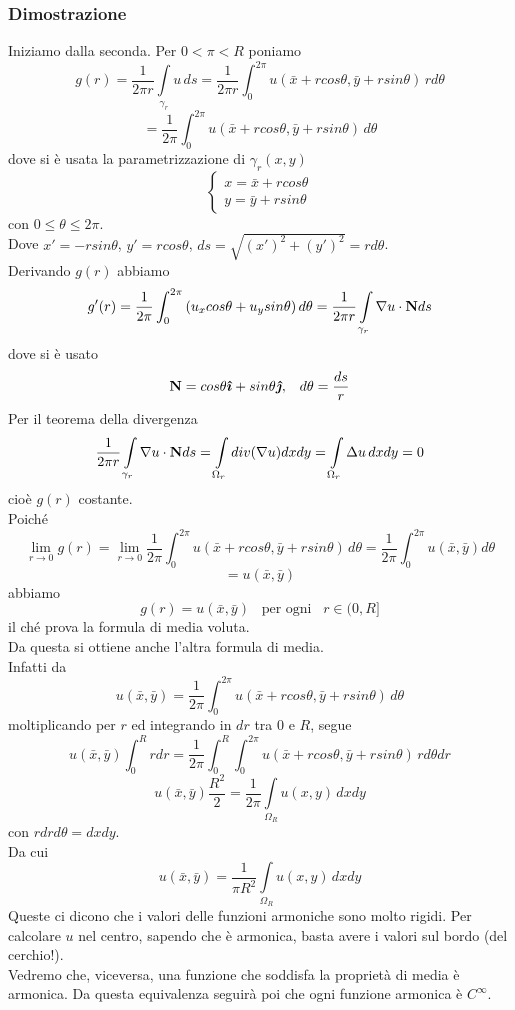 \subsubsection{Dimostrazione}
Iniziamo dalla seconda. Per $0<\pi<R$ poniamo
\[
	g(r)= \frac{1}{2\pi r}
	\int \limits_{\gamma_r}
	u \, ds=
	\frac{1}{2\pi r}
	\int_0^{2\pi}
	u(\bar{x}+rcos \theta, \bar{y} + rsin \theta) \, r d\theta
\]
\[
	= \frac{1}{2\pi}
	\int_0^{2\pi}
	u(\bar{x}+rcos \theta, \bar{y} + rsin \theta) \, d\theta
\]
dove si \`e usata la parametrizzazione di $\gamma_r(x,y)$
\[
	\left\{
		\begin{array}{l}
			x= \bar{x} + rcos\theta \\
			y= \bar{y} + rsin\theta
		\end{array}
	\right.
\]
con $0 \leq \theta \leq 2\pi$.\\
Dove $x'=-rsin \theta$, $y'= rcos \theta$, $ds= \sqrt{(x')^2+ (y')^2}=
rd\theta$.\\
Derivando $g(r)$ abbiamo
\[
	g'(r)= \frac{1}{2\pi}
	\int_0^{2\pi}
	\left(
		u_x cos\theta + u_y sin \theta
	\right)d\theta=
	\frac{1}{2\pi r}
	\int \limits_{\gamma_r} \nabla u \cdot {\bf N} ds
\]
dove si \`e usato
\[
	{\bf N} = cos\theta \boldsymbol{\hat{\imath}} + sin \theta \boldsymbol{\hat{\jmath}} , \;\;\;
	d\theta= \frac{ds}{r}
\]
Per il teorema della divergenza
\[
	\frac{1}{2\pi r}
	\int \limits_{\gamma_r} \nabla u \cdot {\bf N} ds=
	\int \limits_{\Omega_r} div (\nabla u) dxdy=
	\int \limits_{\Omega_r} \Delta u \, dxdy= 0
\]
cio\`e $g(r)$ costante.\\
Poich\'e
\[
	\lim_{r \to 0} g(r)=
	\lim_{r \to 0} \frac{1}{2 \pi}
	\int_0^{2\pi}
	u(\bar{x}+rcos \theta, \bar{y} + rsin \theta) \, d\theta=
	\frac{1}{2 \pi} \int_0^{2\pi}
	u(\bar{x}, \bar{y}) d\theta
\]
\[
	= u(\bar{x}, \bar{y})
\]
abbiamo
\[
	g(r)= u(\bar{x}, \bar{y}) \;\;\; \text{per ogni} \;\;\; r \in (0,R]
\]
il ch\'e prova la formula di media voluta.\\
Da questa si ottiene anche l'altra formula di media.\\  Infatti da
\[
	u(\bar{x}, \bar{y})=
	\frac{1}{2 \pi} \int_0^{2 \pi}
	u(\bar{x}+rcos \theta, \bar{y} + rsin \theta) \, d\theta
\]
moltiplicando per $r$ ed integrando in $dr$ tra $0$ e $R$, segue
\[
	u(\bar{x}, \bar{y})\int_0^R rdr=
	\frac{1}{2\pi}\int_0^R
	\int_0^{2\pi}
	u(\bar{x}+rcos \theta, \bar{y} + rsin \theta) \, rd\theta dr
\]
\[
	u(\bar{x}, \bar{y})\frac{R^2}{2}=
	\frac{1}{2\pi} \int \limits_{\Omega_R} u(x,y) \, dxdy
\]
con $rdrd\theta= dxdy$.\\
Da cui
\[
	u(\bar{x}, \bar{y})=
	\frac{1}{\pi R^2}
	\int \limits_{\Omega_R} u(x,y) \, dxdy
\]
Queste ci dicono che i valori delle funzioni armoniche sono molto rigidi.
Per calcolare $u$ nel centro, sapendo che \`e armonica, basta avere i
valori sul bordo (del cerchio!).\\
Vedremo che, viceversa, una funzione che soddisfa la propriet\`a di media \`e
armonica. Da questa equivalenza seguir\`a poi che ogni funzione armonica \`e
$C^{\infty}$.
